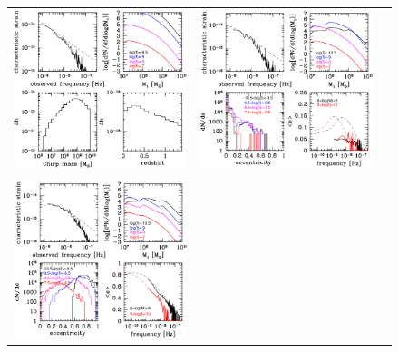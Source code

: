 \documentclass[prd,aps,eqsecnum]{revtex4}
\begin{document}
\begin{figure}
\centering
\begin{tabular}{ccc}
\includegraphics[width=8.0cm,clip=true,angle=0]{plots/fig_circ}&\hspace{1.0cm}
\includegraphics[width=8.0cm,clip=true,angle=0]{plots/fig_ecc0}\\
\vspace{0.7cm}\\
\includegraphics[width=8.0cm,clip=true,angle=0]{plots/fig_ecc5}&\hspace{1.0cm}

\end{tabular}
\end{figure}
\end{document}
